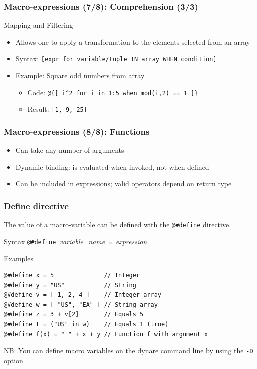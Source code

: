 \documentclass{beamer}
\begin{document}
\begin{frame}[fragile=singleslide]
  \frametitle{Macro-expressions (7/8): Comprehension (3/3)}
  \begin{block}{Mapping and Filtering}
    \begin{itemize}
    \item Allows one to apply a transformation to the elements selected from an array
    \item Syntax: \texttt{[expr for variable/tuple IN array WHEN condition]}
    \item Example: Square odd numbers from array
      \begin{itemize}
      \item Code: \texttt{@\{[ i\^{}2 for i in 1:5 when mod(i,2) == 1 ]\}}
      \item Result: \texttt{[1, 9, 25]}
      \end{itemize}
    \end{itemize}
  \end{block}
\end{frame}

\begin{frame}[fragile=singleslide]
  \frametitle{Macro-expressions (8/8): Functions}
  \begin{itemize}
  \item Can take any number of arguments
  \item Dynamic binding: is evaluated when invoked, not when defined
  \item Can be included in expressions; valid operators depend on return type
  \end{itemize}
\end{frame}

\begin{frame}[fragile=singleslide]
  \frametitle{Define directive}

  The value of a macro-variable can be defined with the \verb+@#define+ directive.

  \begin{block}{Syntax}
    \verb+@#define +\textit{variable\_name}\verb+ = +\textit{expression}
  \end{block}

  \begin{block}{Examples}
\begin{verbatim}
@#define x = 5              // Integer
@#define y = "US"           // String
@#define v = [ 1, 2, 4 ]    // Integer array
@#define w = [ "US", "EA" ] // String array
@#define z = 3 + v[2]       // Equals 5
@#define t = ("US" in w)    // Equals 1 (true)
@#define f(x) = " " + x + y // Function f with argument x
\end{verbatim}
  \end{block}
  NB: You can define macro variables on the dynare command line by using the \texttt{-D} option
\end{frame}
\end{document}
